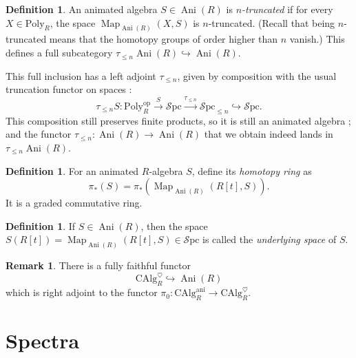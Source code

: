 \documentclass[11pt]{article}
\theoremstyle{definition}
\newtheorem{definition}[theorem]{Definition}
\newtheorem{remark}[theorem]{Remark}
\newcommand{\Ani}{\operatorname{Ani}}
\newcommand{\ani}{\mathrm{ani}}
\newcommand{\CAlg}{\mathrm{CAlg}}
\newcommand{\heart}{\heartsuit}
\newcommand{\Map}{\operatorname{Map}}
\newcommand{\op}{\mathrm{op}}
\newcommand{\Poly}{\mathrm{Poly}}
\newcommand{\Spc}{\mathcal{S}\mathrm{pc}}
\begin{document}
\begin{definition}
    An animated algebra $S \in \Ani(R)$ is \emph{$n$-truncated} if for every $X \in \Poly_R$, the space $\Map_{\Ani(R)}(X, S)$ is $n$-truncated. (Recall that being $n$-truncated means that the homotopy groups of order higher than $n$ vanish.)
    This defines a full subcategory $\tau_{\leqslant n} \Ani(R) \hookrightarrow \Ani(R)$.
\end{definition}
This full inclusion has a left adjoint $\tau_{\leqslant n}$, given by composition with the usual truncation functor on spaces :
\[
    \tau_{\leqslant n} S : \Poly_R^{\op} \xrightarrow{S} \Spc \xrightarrow{\tau_{\leqslant n}} \Spc_{\leqslant n} \hookrightarrow \Spc.
\]
This composition still preserves finite products, so it is still an animated algebra ; and the functor $\tau_{\leqslant n} : \Ani(R) \to \Ani(R)$ that we obtain indeed lands in $\tau_{\leqslant n}\Ani(R)$.

\begin{definition}
    For an animated $R$-algebra $S$, define its \emph{homotopy ring} as
    \[
        \pi_*(S) = \pi_*(\Map_{\Ani(R)}(R[t], S)).
    \]
    It is a graded commutative ring.
\end{definition}

\begin{definition}
    If $S \in \Ani(R)$, then the space $S(R[t]) = \Map_{\Ani(R)}(R[t], S) \in \Spc$ is called the \emph{underlying space} of $S$.
\end{definition}

\begin{remark}
    There is a fully faithful functor
    \[
        \CAlg_R^{\heart} \hookrightarrow \Ani(R)
    \]
    which is right adjoint to the functor $\pi_0 : \CAlg_R^{\ani} \to \CAlg_R^{\heart}$.
\end{remark}

\section{Spectra}
\end{document}
